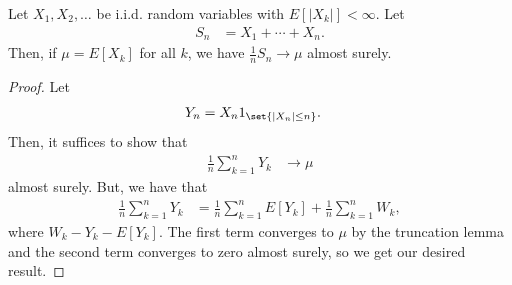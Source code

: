 \documentclass[10pt]{mypackage}
\begin{document}
\begin{theorem}
  Let $X_1,X_2,\dots$ be i.i.d. random variables with $E\left[ \left\vert X_k \right\vert \right] < \infty$. Let
  \begin{align*}
    S_n &= X_1 + \cdots + X_n.
  \end{align*}
  Then, if $\mu = E\left[ X_k \right]$ for all $k$, we have $\frac{1}{n}S_n \to \mu$ almost surely.
\end{theorem}
\begin{proof}
  Let
  \begin{align*}
    Y_n &= X_n1_{\set{\left\vert X_n \right\vert\leq n}}.
  \end{align*}
  Then, it suffices to show that
  \begin{align*}
    \frac{1}{n}\sum_{k=1}^{n}Y_k &\to \mu
  \end{align*}
  almost surely. But, we have that
  \begin{align*}
    \frac{1}{n}\sum_{k=1}^{n}Y_k &= \frac{1}{n}\sum_{k=1}^{n}E\left[ Y_k \right] + \frac{1}{n}\sum_{k=1}^{n}W_k,
  \end{align*}
  where $W_k - Y_k-E\left[ Y_k \right]$. The first term converges to $\mu$ by the truncation lemma and the second term converges to zero almost surely, so we get our desired result.
\end{proof}
\end{document}
